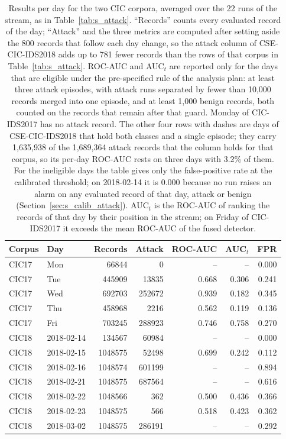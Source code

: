 \begin{table}[ht]\centering\footnotesize\setlength{\tabcolsep}{3.5pt}
\begin{tabular}{llrrrrr}
\hline
\textbf{Corpus} & \textbf{Day} & \textbf{Records} & \textbf{Attack} & \textbf{ROC-AUC} & \textbf{AUC$_t$} & \textbf{FPR}\\
\hline
CIC17 & Mon & 66844 & 0 & -- & -- & 0.000\\
CIC17 & Tue & 445909 & 13835 & 0.668 & 0.306 & 0.241\\
CIC17 & Wed & 692703 & 252672 & 0.939 & 0.182 & 0.345\\
CIC17 & Thu & 458968 & 2216 & 0.562 & 0.119 & 0.136\\
CIC17 & Fri & 703245 & 288923 & 0.746 & 0.758 & 0.270\\
CIC18 & 2018-02-14 & 134567 & 60984 & -- & -- & 0.000\\
CIC18 & 2018-02-15 & 1048575 & 52498 & 0.699 & 0.242 & 0.112\\
CIC18 & 2018-02-16 & 1048574 & 601199 & -- & -- & 0.894\\
CIC18 & 2018-02-21 & 1048575 & 687564 & -- & -- & 0.616\\
CIC18 & 2018-02-22 & 1048566 & 362 & 0.500 & 0.436 & 0.366\\
CIC18 & 2018-02-23 & 1048575 & 566 & 0.518 & 0.423 & 0.362\\
CIC18 & 2018-03-02 & 1048575 & 286191 & -- & -- & 0.292\\
\hline
\end{tabular}
\caption{Results per day for the two CIC corpora, averaged over the 22 runs of the stream, as in Table~\ref{tab:s_attack}. ``Records'' counts every evaluated record of the day; ``Attack'' and the three metrics are computed after setting aside the 800 records that follow each day change, so the attack column of CSE-CIC-IDS2018 adds up to 781 fewer records than the rows of that corpus in Table~\ref{tab:s_attack}. ROC-AUC and AUC$_t$ are reported only for the days that are eligible under the pre-specified rule of the analysis plan: at least three attack episodes, with attack runs separated by fewer than 10{,}000 records merged into one episode, and at least 1{,}000 benign records, both counted on the records that remain after that guard. Monday of CIC-IDS2017 has no attack record. The other four rows with dashes are days of CSE-CIC-IDS2018 that hold both classes and a single episode; they carry 1{,}635{,}938 of the 1{,}689{,}364 attack records that the column holds for that corpus, so its per-day ROC-AUC rests on three days with 3.2\% of them. For the ineligible days the table gives only the false-positive rate at the calibrated threshold; on 2018-02-14 it is 0.000 because no run raises an alarm on any evaluated record of that day, attack or benign (Section~\ref{sec:s_calib_attack}). AUC$_t$ is the ROC-AUC of ranking the records of that day by their position in the stream; on Friday of CIC-IDS2017 it exceeds the mean ROC-AUC of the fused detector.}\label{tab:s_perday}
\end{table}
